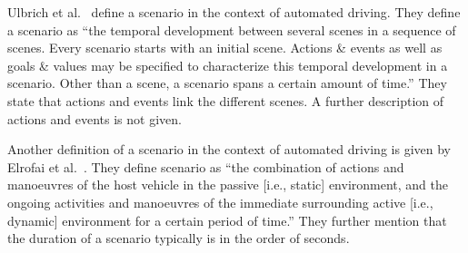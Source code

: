 \documentclass[10pt,final,a4paper,oneside,onecolumn]{article}
\begin{document}
Ulbrich et al.\ \cite{ulbrich2015} define a scenario in the context of automated driving. They define a scenario as ``the temporal development between several scenes in a sequence of scenes. Every scenario starts with an initial scene. Actions \& events as well as goals \& values may be specified to characterize this temporal development in a scenario. Other than a scene, a scenario spans a certain amount of time.'' They state that actions and events link the different scenes. A further description of actions and events is not given.

Another definition of a scenario in the context of automated driving is given by Elrofai et al.\ \cite{elrofai2016scenario}. They define scenario as ``the combination of actions and manoeuvres of the host vehicle in the passive [i.e., static] environment, and the ongoing activities and manoeuvres of the immediate surrounding active [i.e., dynamic] environment for a certain period of time.'' They further mention that the duration of a scenario typically is in the order of seconds.
\end{document}
